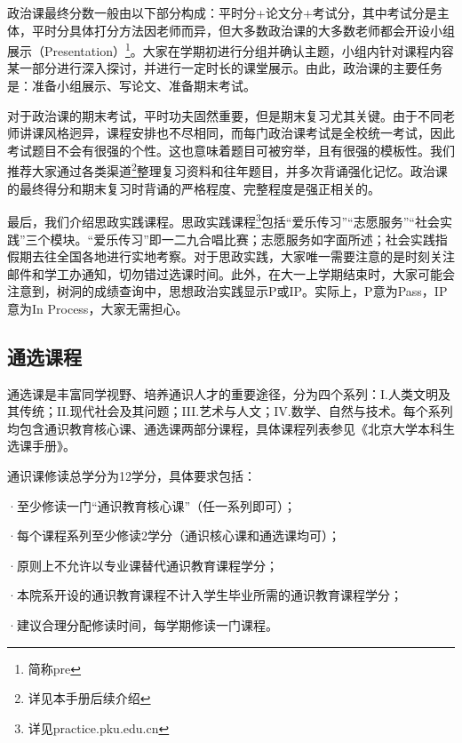 \documentclass[11pt,oneside]{book}
\begin{document}
\vspace{10pt}

政治课最终分数一般由以下部分构成：平时分+论文分+考试分，其中考试分是主体，平时分具体打分方法因老师而异，但大多数政治课的大多数老师都会开设小组展示（Presentation）\footnote{简称pre}。大家在学期初进行分组并确认主题，小组内针对课程内容某一部分进行深入探讨，并进行一定时长的课堂展示。由此，政治课的主要任务是：准备小组展示、写论文、准备期末考试。

\vspace{10pt}

对于政治课的期末考试，平时功夫固然重要，但是期末复习尤其关键。由于不同老师讲课风格迥异，课程安排也不尽相同，而每门政治课考试是全校统一考试，因此考试题目不会有很强的个性。这也意味着题目可被穷举，且有很强的模板性。我们推荐大家通过各类渠道\footnote{详见本手册后续介绍}整理复习资料和往年题目，并多次背诵强化记忆。政治课的最终得分和期末复习时背诵的严格程度、完整程度是强正相关的。

\vspace{10pt}

最后，我们介绍思政实践课程。思政实践课程\footnote{详见practice.pku.edu.cn}包括“爱乐传习”“志愿服务”“社会实践”三个模块。“爱乐传习”即一二九合唱比赛；志愿服务如字面所述；社会实践指假期去往全国各地进行实地考察。对于思政实践，大家唯一需要注意的是时刻关注邮件和学工办通知，切勿错过选课时间。此外，在大一上学期结束时，大家可能会注意到，树洞的成绩查询中，思想政治实践显示P或IP。实际上，P意为Pass，IP意为In Process，大家无需担心。

\subsection{通选课程}
通选课是丰富同学视野、培养通识人才的重要途径，分为四个系列：I.人类文明及其传统；II.现代社会及其问题；III.艺术与人文；IV.数学、自然与技术。每个系列均包含通识教育核心课、通选课两部分课程，具体课程列表参见《北京大学本科生选课手册》。

\vspace{10pt}

通识课修读总学分为12学分，具体要求包括：

·至少修读一门“通识教育核心课”（任一系列即可）；

·每个课程系列至少修读2学分（通识核心课和通选课均可）；

·原则上不允许以专业课替代通识教育课程学分；

·本院系开设的通识教育课程不计入学生毕业所需的通识教育课程学分；

·建议合理分配修读时间，每学期修读一门课程。
\end{document}
